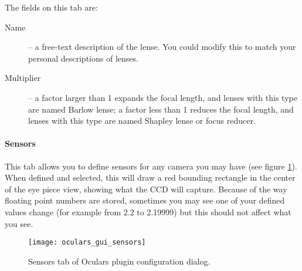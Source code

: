 The fields on this tab are:
\begin{description}
\item[Name] -- a free-text description of the lense. You could modify this to match your personal descriptions of lenses.
\item[Multiplier] -- a factor larger than 1 expands the focal length, and lenses with this type are named Barlow lense; 
                     a factor less   than 1 reduces the focal length, and lenses with this type are named Shapley lense or focus reducer.
\end{description}

\paragraph{Sensors}

This tab allows you to define sensors for any camera you may have (see figure \ref{fig:plugins:Oculars:Gui:Sensors}). 
When defined and selected, this will draw a red bounding rectangle in the center of the eye piece view, showing what the CCD will capture. 
Because of the way floating point numbers are stored, sometimes you may see one of your defined values change (for example from 2.2 to 2.19999) but this should not affect what you see.

\begin{figure}[ht]\centering
\texttt{[image: oculars\_gui\_sensors]}
\caption{Sensors tab of Oculars plugin configuration dialog.}
\label{fig:plugins:Oculars:Gui:Sensors}
\end{figure}

